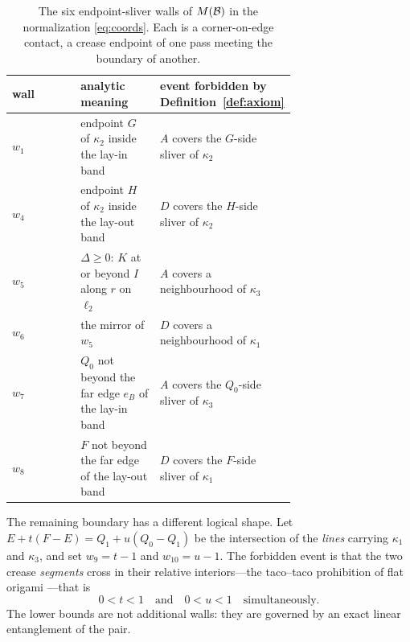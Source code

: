 \begin{table}[t]
\centering\small
\begin{tabular}{lp{0.28\linewidth}p{0.42\linewidth}}
\hline
wall & \raggedright analytic meaning & \raggedright event forbidden by Definition~\ref{def:axiom}\tabularnewline
\hline
$w_1$ & \raggedright endpoint $G$ of $\kappa_2$ inside the lay-in band & \raggedright $A$ covers the $G$-side sliver of $\kappa_2$\tabularnewline
$w_4$ & \raggedright endpoint $H$ of $\kappa_2$ inside the lay-out band & \raggedright $D$ covers the $H$-side sliver of $\kappa_2$\tabularnewline
$w_5$ & \raggedright $\Delta\ge0$: $K$ at or beyond $I$ along $r$ on $\ell_2$ & \raggedright $A$ covers a neighbourhood of $\kappa_3$\tabularnewline
$w_6$ & \raggedright the mirror of $w_5$ & \raggedright $D$ covers a neighbourhood of $\kappa_1$\tabularnewline
$w_7$ & \raggedright $Q_0$ not beyond the far edge $e_B$ of the lay-in band & \raggedright $A$ covers the $Q_0$-side sliver of $\kappa_3$\tabularnewline
$w_8$ & \raggedright $F$ not beyond the far edge of the lay-out band & \raggedright $D$ covers the $F$-side sliver of $\kappa_1$\tabularnewline
\hline
\end{tabular}
\caption{The six endpoint-sliver walls of $M(\mathcal{B})$ in the normalization \eqref{eq:coords}. Each is a corner-on-edge contact, a crease endpoint of one pass meeting the boundary of another.}
\label{tab:walls}
\end{table}

The remaining boundary has a different logical shape. Let $E+t(F-E)=Q_1+u(Q_0-Q_1)$ be the intersection of the \emph{lines} carrying $\kappa_1$ and $\kappa_3$, and set $w_9=t-1$ and $w_{10}=u-1$. The forbidden event is that the two crease \emph{segments} cross in their relative interiors---the taco--taco prohibition of flat origami \cite{justin1997}---that is
\[0<t<1\quad\text{and}\quad 0<u<1\quad\text{simultaneously}.\]
The lower bounds are not additional walls: they are governed by an exact linear entanglement of the pair.

